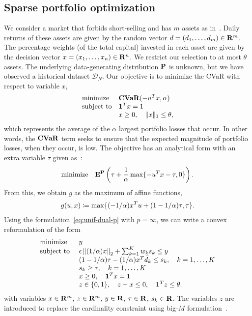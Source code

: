 \documentclass[12pt]{article}
\newcommand{\citep}{\cite}
\theoremstyle{thmstyleone}%
\theoremstyle{thmstyletwo}%
\theoremstyle{thmstylethree}%
\newcommand{\reviewChanges}{}
\begin{document}
\subsection{\reviewChanges{Sparse portfolio optimization}}%
\label{sub:sparse_portfolio_optimization}
\reviewChanges{
We consider a market that forbids short-selling and has $m$ assets as in~\citep{mohajerin_esfahani_data-driven_2018}.
Daily returns of these assets are given by the random vector $d = (d_1, \dots, d_m) \in {\mathbf R}^m$.
The percentage weights (of the total capital) invested in each asset are given by the decision vector ${x = (x_1, \dots, x_n) \in {\mathbf R}^n}$.
We restrict our selection to at most $\theta$ assets.
The underlying data-generating distribution ${\mathbf P}$ is unknown, but we have observed a historical dataset  $\mathcal{D}_N$.
Our objective is to minimize the CVaR with respect to variable $x$,
\begin{equation*}
	\label{eq:portfolio}
	\begin{array}{ll}
	\text{minimize  } &\mathop{\bf CVaR}(- u^Tx,\alpha)\\
	\text{subject to} & \mathbf 1^T x = 1\\
			  & x \ge 0, \quad \|x\|_1 \leq \theta,
	\end{array}
\end{equation*}
which represents the average of the $\alpha$ largest portfolio losses that occur. In other words, the $\mathop{\bf CVaR}$ term seeks to ensure that the expected magnitude of portfolio losses, when they occur, is low.
The objective has an analytical form with an extra variable $\tau$ given as~\citep{cvaropt,mohajerin_esfahani_data-driven_2018}:
\begin{equation*}
	\text{minimize} \quad \mathbf{E}^{{\mathbf P}}\left(\tau +\frac{1}{\alpha} \max\{-u^Tx -\tau, 0\}\right).
\end{equation*}
From this, we obtain $g$ as the maximum of affine functions,
\begin{equation*}
	g(u,x) \coloneqq \max\{(-1/\alpha)x^Tu + (1 - 1/\alpha)\tau, \tau \}.
\end{equation*}
Using the formulation~\eqref{eq:unif-dual-p} with $p= \infty$, we can write a convex reformulation of the form
\begin{equation*}
	\label{eq:portfolio_1}
	\begin{array}{ll}
	\text{minimize } & y\\
	\text{subject to } & \epsilon \left\|(1/\alpha)x\right\|_2 + \sum^{K}_{k=1} w_k s_k \leq y\\
	&  (1 - 1/\alpha)\tau - (1/\alpha)x^T\bar{d}_k    \leq s_k,\quad k = 1,\dots,K\\
	&  s_k \geq \tau, \quad k = 1,\dots,K\\
	& x \geq 0, \quad \mathbf{1}^T x = 1\\
	& z \in \{0,1\}, \quad z - x \leq 0, \quad \mathbf 1^Tz \leq \theta.
	\end{array}
\end{equation*}
with variables $x \in {\mathbf R}^m$, $z \in {\mathbf R}^m$, $y \in {\mathbf R}$, $\tau \in {\mathbf R}$, $s_k \in {\mathbf R}$. The variables $z$ are introduced to replace the cardinality constraint using big-$M$ formulation~\citep{sparseportfolio}.}
\end{document}

